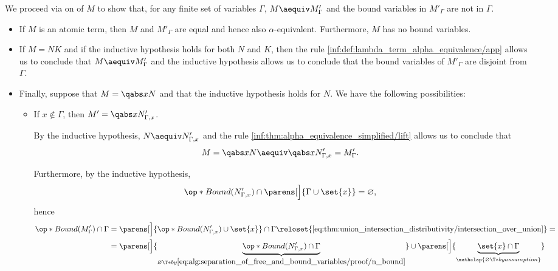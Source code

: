 \begin{defproof}
  We proceed via  on of \( M \) to show that, for any finite set of variables \( \Gamma \), \( M \aequiv M'_\Gamma \) and the bound variables in \( M'_\Gamma \) are not in \( \Gamma \).

  \begin{itemize}
    \item If \( M \) is an atomic term, then \( M \) and \( M'_\Gamma \) are equal and hence also \( \alpha \)-equivalent. Furthermore, \( M \) has no bound variables.

    \item If \( M = NK \) and if the inductive hypothesis holds for both \( N \) and \( K \), then the rule \ref{inf:def:lambda_term_alpha_equivalence/app} allows us to conclude that \( M \aequiv M'_\Gamma \) and the inductive hypothesis allows us to conclude that the bound variables of \( M'_\Gamma \) are disjoint from \( \Gamma \).

    \item Finally, suppose that \( M = \qabs x N \) and that the inductive hypothesis holds for \( N \). We have the following possibilities:
    \begin{itemize}
      \item If \( x \notin \Gamma \), then \( M' = \qabs x N'_{\Gamma,x} \).

      By the inductive hypothesis, \( N \aequiv N'_{\Gamma,x} \) and the rule \ref{inf:thm:alpha_equivalence_simplified/lift} allows us to conclude that
      \begin{equation*}
        M = \qabs x N \aequiv \qabs x N'_{\Gamma,x} = M'_\Gamma.
      \end{equation*}

      Furthermore, by the inductive hypothesis,
      \begin{equation}\label{eq:alg:separation_of_free_and_bound_variables/proof/n_bound}
        \op*{Bound}(N'_{\Gamma,x}) \cap \parens[\Big]{ \Gamma \cup \set{ x } } = \varnothing,
      \end{equation}
      hence
      \begin{align*}
        \op*{Bound}(M'_\Gamma) \cap \Gamma
        &=
        \parens[\Big]{ \op*{Bound}(N'_{\Gamma,x}) \cup \set{ x } } \cap \Gamma
        \reloset {\eqref{eq:thm:union_intersection_distributivity/intersection_over_union}} = \\ &=
        \parens[\Big]{ \underbrace{\op*{Bound}(N'_{\Gamma,x}) \cap \Gamma }_{\varnothing \T*{by} \eqref{eq:alg:separation_of_free_and_bound_variables/proof/n_bound}} } \cup \parens[\Big]{ \underbrace{\set{ x } \cap \Gamma}_{\mathclap{\varnothing \T*{by assumption}}} }
      \end{align*}


\end{itemize}
\end{itemize}
\end{defproof}
